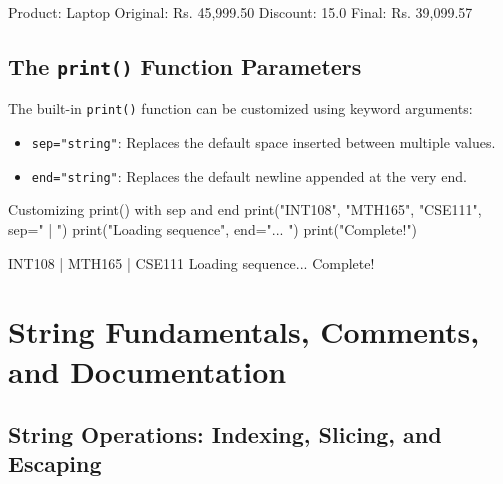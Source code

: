 \begin{outputbox}
Product:           Laptop
Original: Rs.    45,999.50
Discount:        15.0%
Final:    Rs.    39,099.57
\end{outputbox}

\subsection{The \texttt{print()} Function Parameters}

The built-in \texttt{print()} function can be customized using keyword arguments:
\begin{itemize}[leftmargin=1.5em]
    \item \texttt{sep="string"}: Replaces the default space inserted between multiple values.
    \item \texttt{end="string"}: Replaces the default newline appended at the very end.
\end{itemize}

\begin{pythoncode}{Customizing print() with sep and end}
print("INT108", "MTH165", "CSE111", sep=" | ")
print("Loading sequence", end="... ")
print("Complete!")
\end{pythoncode}

\begin{outputbox}
INT108 | MTH165 | CSE111
Loading sequence... Complete!
\end{outputbox}


\section{String Fundamentals, Comments, and Documentation}

\subsection{String Operations: Indexing, Slicing, and Escaping}

